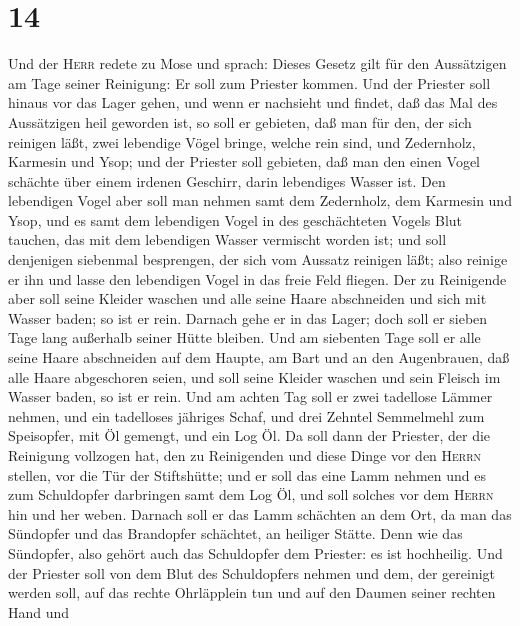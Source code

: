 \hypertarget{section-13}{%
\section{14}\label{section-13}}

 Und der \textsc{Herr} redete zu Mose und sprach: Dieses
Gesetz gilt für den Aussätzigen am Tage seiner Reinigung: 
Er soll zum Priester kommen.  Und der Priester soll hinaus
vor das Lager gehen, und wenn er nachsieht und findet, daß das Mal des
Aussätzigen heil geworden ist,  so soll er gebieten, daß
man für den, der sich reinigen läßt, zwei lebendige Vögel bringe, welche
rein sind, und Zedernholz, Karmesin und Ysop;  und der
Priester soll gebieten, daß man den einen Vogel schächte über einem
irdenen Geschirr, darin lebendiges Wasser ist.  Den
lebendigen Vogel aber soll man nehmen samt dem Zedernholz, dem Karmesin
und Ysop, und es samt dem lebendigen Vogel in des geschächteten Vogels
Blut tauchen, das mit dem lebendigen Wasser vermischt worden ist;
 und soll denjenigen siebenmal besprengen, der sich vom
Aussatz reinigen läßt; also reinige er ihn und lasse den lebendigen
Vogel in das freie Feld fliegen.  Der zu Reinigende aber
soll seine Kleider waschen und alle seine Haare abschneiden und sich mit
Wasser baden; so ist er rein. Darnach gehe er in das Lager; doch soll er
sieben Tage lang außerhalb seiner Hütte bleiben.  Und am
siebenten Tage soll er alle seine Haare abschneiden auf dem Haupte, am
Bart und an den Augenbrauen, daß alle Haare abgeschoren seien, und soll
seine Kleider waschen und sein Fleisch im Wasser baden, so ist er rein.
 Und am achten Tag soll er zwei tadellose Lämmer nehmen,
und ein tadelloses jähriges Schaf, und drei Zehntel Semmelmehl zum
Speisopfer, mit Öl gemengt, und ein Log Öl.  Da soll dann
der Priester, der die Reinigung vollzogen hat, den zu Reinigenden und
diese Dinge vor den \textsc{Herrn} stellen, vor die Tür der Stiftshütte;
 und er soll das eine Lamm nehmen und es zum Schuldopfer
darbringen samt dem Log Öl, und soll solches vor dem \textsc{Herrn} hin
und her weben.  Darnach soll er das Lamm schächten an dem
Ort, da man das Sündopfer und das Brandopfer schächtet, an heiliger
Stätte. Denn wie das Sündopfer, also gehört auch das Schuldopfer dem
Priester: es ist hochheilig.  Und der Priester soll von
dem Blut des Schuldopfers nehmen und dem, der gereinigt werden soll, auf
das rechte Ohrläpplein tun und auf den Daumen seiner rechten Hand und
